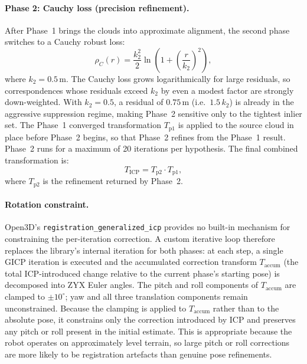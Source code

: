 \paragraph{Phase 2: Cauchy loss (precision refinement).}
After Phase~1 brings the clouds into approximate alignment, the second phase switches to a Cauchy robust loss:
%
\begin{equation}
    \rho_C(r) = \frac{k_2^2}{2} \ln\!\left(1 + \left(\frac{r}{k_2}\right)^2\right),
    \label{eq:cauchy-loss}
\end{equation}
%
where $k_2 = 0.5$\,m. The Cauchy loss grows logarithmically for large residuals, so correspondences whose residuals exceed $k_2$ by even a modest factor are strongly down-weighted. With $k_2 = 0.5$, a residual of $0.75$\,m (i.e.\ $1.5\,k_2$) is already in the aggressive suppression regime, making Phase~2 sensitive only to the tightest inlier set. The Phase~1 converged transformation $T_{\text{p1}}$ is applied to the source cloud in place before Phase~2 begins, so that Phase~2 refines from the Phase~1 result. Phase~2 runs for a maximum of 20 iterations per hypothesis. The final combined transformation is:
%
\begin{equation}
    T_{\text{ICP}} = T_{\text{p2}} \cdot T_{\text{p1}},
    \label{eq:icp-combined}
\end{equation}
%
where $T_{\text{p2}}$ is the refinement returned by Phase~2.

\paragraph{Rotation constraint.}
Open3D's \texttt{registration\_generalized\_icp} provides no built-in mechanism for constraining the per-iteration correction. A custom iterative loop therefore replaces the library's internal iteration for both phases: at each step, a single GICP iteration is executed and the accumulated correction transform $T_{\text{accum}}$ (the total ICP-introduced change relative to the current phase's starting pose) is decomposed into ZYX Euler angles. The pitch and roll components of $T_{\text{accum}}$ are clamped to $\pm 10^{\circ}$; yaw and all three translation components remain unconstrained. Because the clamping is applied to $T_{\text{accum}}$ rather than to the absolute pose, it constrains only the correction introduced by ICP and preserves any pitch or roll present in the initial estimate. This is appropriate because the robot operates on approximately level terrain, so large pitch or roll corrections are more likely to be registration artefacts than genuine pose refinements.

